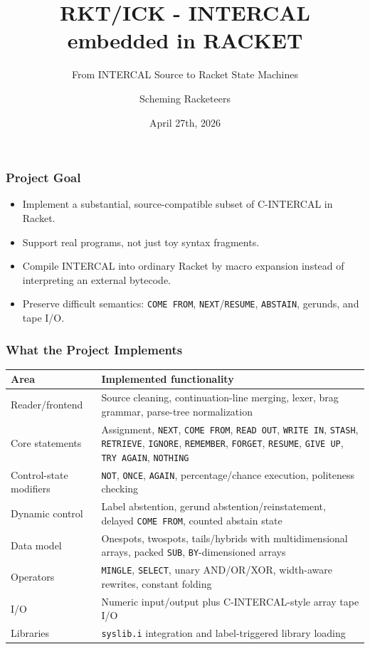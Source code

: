 \documentclass{beamer}
\title{RKT/ICK - INTERCAL embedded in RACKET}
\subtitle{From INTERCAL Source to Racket State Machines}
\author{Scheming Racketeers}
\date{April 27th, 2026}
\begin{document}
\begin{frame}
  \titlepage
\end{frame}

\begin{frame}
  \frametitle{Project Goal}

  \vfill
  \begin{itemize}
    \item Implement a substantial, source-compatible subset of C-INTERCAL in Racket.
    \item Support real programs, not just toy syntax fragments.
    \item Compile INTERCAL into ordinary Racket by macro expansion instead of interpreting an external bytecode.
    \item Preserve difficult semantics: \texttt{COME FROM}, \texttt{NEXT}/\texttt{RESUME}, \texttt{ABSTAIN}, gerunds, and tape I/O.
  \end{itemize}
  \vfill
\end{frame}

\begin{frame}
  \frametitle{What the Project Implements}

  \scriptsize
  \begin{tabularx}{\textwidth}{@{}l>{\raggedright\arraybackslash}X@{}}
    \toprule
    Area & Implemented functionality \\
    \midrule
    Reader/frontend & Source cleaning, continuation-line merging, lexer, brag grammar, parse-tree normalization \\
    Core statements & Assignment, \texttt{NEXT}, \texttt{COME FROM}, \texttt{READ OUT}, \texttt{WRITE IN}, \texttt{STASH}, \texttt{RETRIEVE}, \texttt{IGNORE}, \texttt{REMEMBER}, \texttt{FORGET}, \texttt{RESUME}, \texttt{GIVE UP}, \texttt{TRY AGAIN}, \texttt{NOTHING} \\
    Control-state modifiers & \texttt{NOT}, \texttt{ONCE}, \texttt{AGAIN}, percentage/chance execution, politeness checking \\
    Dynamic control & Label abstention, gerund abstention/reinstatement, delayed \texttt{COME FROM}, counted abstain state \\
    Data model & Onespots, twospots, tails/hybrids with multidimensional arrays, packed \texttt{SUB}, \texttt{BY}-dimensioned arrays \\
    Operators & \texttt{MINGLE}, \texttt{SELECT}, unary AND/OR/XOR, width-aware rewrites, constant folding \\
    I/O & Numeric input/output plus C-INTERCAL-style array tape I/O \\
    Libraries & \texttt{syslib.i} integration and label-triggered library loading \\
    \bottomrule
  \end{tabularx}
\end{frame}
\end{document}
